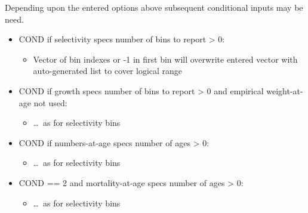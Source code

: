 Depending upon the entered options above subsequent conditional inputs may be need.
\begin{itemize}
	\item COND if selectivity specs number of bins to report > 0:
		\begin{itemize}
			\item Vector of bin indexes or -1 in first bin will overwrite entered vector with auto-generated list to cover logical range
	\end{itemize}
	\item COND if growth specs number of bins to report > 0 and empirical weight-at-age not used:
		\begin{itemize}
			\item \ldots~as for selectivity bins
		\end{itemize}
	\item COND if numbers-at-age specs number of ages > 0:
		\begin{itemize}
			\item \ldots~as for selectivity bins
		\end{itemize}
	\item COND == 2 and mortality-at-age specs number of ages > 0:
		\begin{itemize}
			\item \ldots~as for selectivity bins
		\end{itemize}
\end{itemize}

